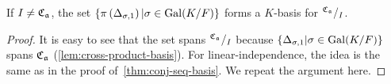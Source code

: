 \begin{lemma}\label{lem:cross-product-quotient-basis}
  If $I \ne \operatorname{\mathfrak{C}}_{\mathfrak{a}}$, the set $\{\pi\left(\Delta_{\sigma, 1}\right)|\sigma\in\operatorname{Gal}(K/F)\}$ forms a $K$-basis for ${}^{\operatorname{\mathfrak{C}}_{\mathfrak{a}}}/_{I}$.
  \leanok
\end{lemma}
\begin{proof}
  It is easy to see that the set spans ${}^{\operatorname{\mathfrak{C}}_{\mathfrak{a}}}/_{I}$ because $\{\Delta_{\sigma, 1}|\sigma\in\operatorname{Gal}(K/F)\}$ spans $\operatorname{\mathfrak{C}}_{\mathfrak{a}}$ (\cref{lem:cross-product-basis}). For linear-independence, the idea is the same as in the proof of~\cref{thm:conj-seq-basis}. We repeat the argument here.


\end{proof}
